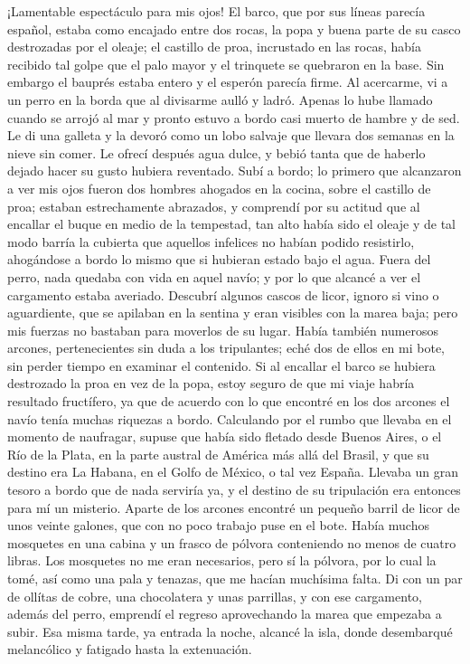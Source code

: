 \documentclass{novela}
\begin{document}
    ¡Lamentable espectáculo para mis ojos! El barco, que por sus líneas parecía español, estaba como encajado entre dos rocas, la popa y buena parte de su casco destrozadas por el oleaje; el castillo de proa, incrustado en las rocas, había recibido tal golpe que el palo mayor y el trinquete se quebraron en la base. Sin embargo el bauprés estaba entero y el esperón parecía firme.
    Al acercarme, vi a un perro en la borda que al divisarme aulló y ladró. Apenas lo hube llamado cuando se arrojó al mar y pronto estuvo a bordo casi muerto de hambre y de sed. Le di una galleta y la devoró como un lobo salvaje que llevara dos semanas en la nieve sin comer. Le ofrecí después agua dulce, y bebió tanta que de haberlo dejado hacer su gusto hubiera reventado.
    Subí a bordo; lo primero que alcanzaron a ver mis ojos fueron dos hombres ahogados en la cocina, sobre el castillo de proa; estaban estrechamente abrazados, y comprendí por su actitud que al encallar el buque en medio de la tempestad, tan alto había sido el oleaje y de tal modo barría la cubierta que aquellos infelices no habían podido resistirlo, ahogándose a bordo lo mismo que si hubieran estado bajo el agua. Fuera del perro, nada quedaba con vida en aquel navío; y por lo que alcancé a ver el cargamento estaba averiado. Descubrí algunos cascos de licor, ignoro si vino o aguardiente, que se apilaban en la sentina y eran visibles con la marea baja; pero mis fuerzas no bastaban para moverlos de su lugar. Había también numerosos arcones, pertenecientes sin duda a los tripulantes; eché dos de ellos en mi bote, sin perder tiempo en examinar el contenido.
    Si al encallar el barco se hubiera destrozado la proa en vez de la popa, estoy seguro de que mi viaje habría resultado fructífero, ya que de acuerdo con lo que encontré en los dos arcones el navío tenía muchas riquezas a bordo. Calculando por el rumbo que llevaba en el momento de naufragar, supuse que había sido fletado desde Buenos Aires, o el Río de la Plata, en la parte austral de América más allá del Brasil, y que su destino era La Habana, en el Golfo de México, o tal vez España. Llevaba un gran tesoro a bordo que de nada serviría ya, y el destino de su tripulación era entonces para mí un misterio.
    Aparte de los arcones encontré un pequeño barril de licor de unos veinte galones, que con no poco trabajo puse en el bote. Había muchos mosquetes en una cabina y un frasco de pólvora conteniendo no menos de cuatro libras. Los mosquetes no me eran necesarios, pero sí la pólvora, por lo cual la tomé, así como una pala y tenazas, que me hacían muchísima falta. Di con un par de ollítas de cobre, una chocolatera y unas parrillas, y con ese cargamento, además del perro, emprendí el regreso aprovechando la marea que empezaba a subir. Esa misma tarde, ya entrada la noche, alcancé la isla, donde desembarqué melancólico y fatigado hasta la extenuación.
\end{document}
